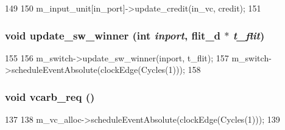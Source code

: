 \begin{DoxyCode}
149 {
150     m_input_unit[in_port]->update_credit(in_vc, credit);
151 }
\end{DoxyCode}
\hypertarget{classRouter__d_ad498c35c5be2d1b524846119d5e2b254}{
\subsubsection[{update\_\-sw\_\-winner}]{\setlength{\rightskip}{0pt plus 5cm}void update\_\-sw\_\-winner (int {\em inport}, \/  {\bf flit\_\-d} $\ast$ {\em t\_\-flit})}}
\label{classRouter__d_ad498c35c5be2d1b524846119d5e2b254}



\begin{DoxyCode}
155 {
156     m_switch->update_sw_winner(inport, t_flit);
157     m_switch->scheduleEventAbsolute(clockEdge(Cycles(1)));
158 }
\end{DoxyCode}
\hypertarget{classRouter__d_a52b408294e91b209388f94238bc709fd}{
\subsubsection[{vcarb\_\-req}]{\setlength{\rightskip}{0pt plus 5cm}void vcarb\_\-req ()}}
\label{classRouter__d_a52b408294e91b209388f94238bc709fd}



\begin{DoxyCode}
137 {
138     m_vc_alloc->scheduleEventAbsolute(clockEdge(Cycles(1)));
139 }
\end{DoxyCode}


